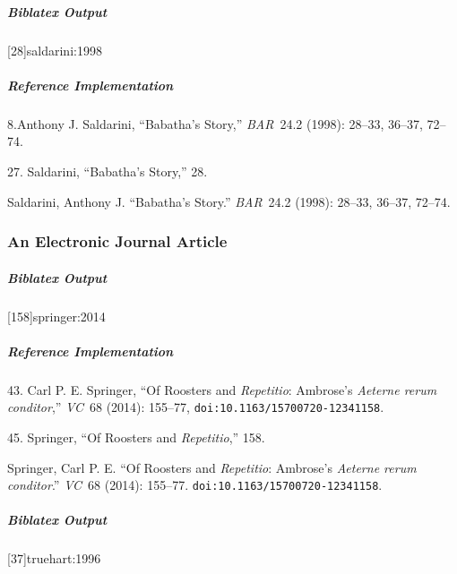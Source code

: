 \documentclass[a4paper]{article}
\newenvironment{biboutput}{%
  \subparagraph{Biblatex Output}
}{\color{black}}
\newenvironment{refimp}{%
  \subparagraph{Reference Implementation}
  \color{reference-colour}
  \rm
}{\par\color{black}}
\begin{document}
\begin{biboutput}
  [28]{saldarini:1998}
\end{biboutput}

\begin{refimp}
  \hspace*{\bibindent}8.Anthony J. Saldarini, “Babatha’s Story,”
  \emph{BAR}~24.2 (1998): 28–33, 36–37, 72–74.

  \hspace*{\bibindent}27. Saldarini, “Babatha’s Story,” 28.

 \hangindent\bibindent Saldarini, Anthony J. “Babatha’s Story.”
 \emph{BAR}~24.2 (1998): 28–33, 36–37, 72–74.

\end{refimp}

\subsubsection{An Electronic Journal Article}

\begin{biboutput}
  [158]{springer:2014}
\end{biboutput}

\begin{refimp}
  \hspace*{\bibindent}43. Carl P. E. Springer, “Of Roosters and
  \emph{Repetitio}: Ambrose’s \emph{Aeterne rerum conditor},” \emph{VC}~68
  (2014): 155–77, \nolinkurl{doi:10.1163/15700720-12341158}.

  \hspace*{\bibindent}45. Springer, “Of Roosters and \emph{Repetitio},” 158.

  \hangindent\bibindent Springer, Carl P. E. “Of Roosters and
  \emph{Repetitio}: Ambrose’s \emph{Aeterne rerum conditor}.” \emph{VC}~68
  (2014): 155–77. \nolinkurl{doi:10.1163/15700720-12341158}.

\end{refimp}

\begin{biboutput}
  [37]{truehart:1996}
\end{biboutput}
\end{document}
